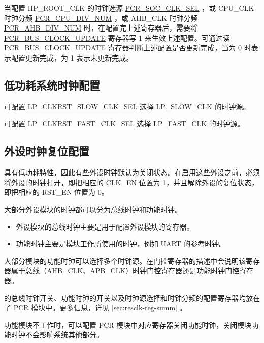\documentclass[main\_\_CN.tex]{subfiles}
\begin{document}
当配置 HP\_ROOT\_CLK 的时钟选源 \hyperref[fielddesc:PCRSOCCLKSEL]{PCR\_SOC\_CLK\_SEL} ，或 CPU\_CLK 时钟分频 \hyperref[fielddesc:PCRCPUDIVNUM]{PCR\_CPU\_DIV\_NUM} ，或 AHB\_CLK 时钟分频 \hyperref[fielddesc:PCRAHBDIVNUM]{PCR\_AHB\_DIV\_NUM} 时，在配置完上述寄存器后，需要将 \hyperref[fielddesc:PCRBUSCLOCKUPDATE]{PCR\_BUS\_CLOCK\_UPDATE} 寄存器写 1 来生效上述配置。可通过读 \hyperref[fielddesc:PCRBUSCLOCKUPDATE]{PCR\_BUS\_CLOCK\_UPDATE} 寄存器判断上述配置是否更新完成，当为 0 时表示配置更新完成，为 1 表示未更新完成。

\subsection{低功耗系统时钟配置}

可配置 \hyperref[fielddesc:LPCLKRSTSLOWCLKSEL]{LP\_CLKRST\_SLOW\_CLK\_SEL} 选择 LP\_SLOW\_CLK 的时钟源。

可配置 \hyperref[fielddesc:LPCLKRSTFASTCLKSEL]{LP\_CLKRST\_FAST\_CLK\_SEL} 选择 LP\_FAST\_CLK 的时钟源。

\subsection{外设时钟复位配置}\label{sec:resclk-periperal-clock-configuration}

\begin{importantlisting}
\vspace{-0.5em}

\chipname{} 具有低功耗特性，因此有些外设时钟默认为关闭状态。在启用这些外设之前，必须将外设的时钟打开，即把相应的 CLK\_EN 位置为 1，并且解除外设的复位状态，即把相应的 RST\_EN 位置为 0。
\end{importantlisting}

大部分外设模块的时钟都可以分为总线时钟和功能时钟。
\begin{itemize}
    \item 外设模块的总线时钟主要是用于配置外设模块的寄存器。
    \item 功能时钟主要是模块工作所使用的时钟，例如 UART 的参考时钟。
\end{itemize}
大部分模块的功能时钟可以选择多个时钟源。在门控寄存器的描述中会说明该寄存器属于总线（AHB\_CLK、APB\_CLK）时钟门控寄存器还是功能时钟门控寄存器。

\chipname{} 的总线时钟开关、功能时钟的开关以及时钟源选择和时钟分频的配置寄存器均放在了 PCR 模块中。更多信息，详见 \ref{sec:resclk-reg-summ} \textit{}。

功能模块不工作时，可以配置 PCR 模块中对应寄存器关闭功能时钟，关闭模块功能时钟不会影响系统其他部分。
\end{document}
